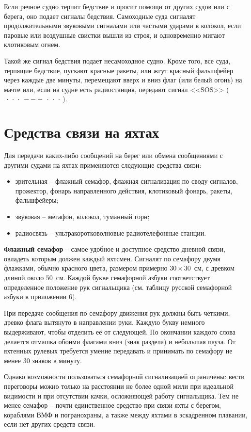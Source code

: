 \documentclass[a4paper, 12pt, twoside, final]{scrbook}
\begin{document}
Если речное судно терпит бедствие и просит помощи от других судов или с берега, оно подает сигналы бедствия. Самоходные суда сигналят продолжительными звуковыми сигналами или частыми ударами в колокол, если паровые или воздушные свистки вышли из строя, и одновременно мигают клотиковым огнем.

Такой же сигнал бедствия подает несамоходное судно. Кроме того, все суда, терпящие бедствие, пускают красные ракеты, или жгут красный фальшфейер через каждые две минуты, перемещают вверх и вниз флаг (или белый огонь) на мачте или, если на судне есть радиостанция, передают сигнал <<SOS>> ($\ \cdot\ \cdot\ \cdot\ - - -\ \cdot\ \cdot\ \cdot\ $).

\section{Средства связи на яхтах}

Для передачи каких-либо сообщений на берег или обмена сообщениями с другими судами на яхтах применяются следующие средства связи:

\begin{itemize}
\item зрительная \--- флажный семафор, флажная сигнализация по своду сигналов, прожектор, фонарь направленного действия, клотиковый фонарь, ракеты, фальшфейеры;
\item звуковая \--- мегафон, колокол, туманный горн;
\item радиосвязь \--- ультракоротковолновые радиотелефонные станции.
\end{itemize}

        \textbf{Флажный семафор} \--- самое удобное и доступное средство дневной связи, овладеть которым должен каждый яхтсмен. Сигналят по семафору двумя флажками, обычно красного цвета, размером примерно $30\times30$~см, с древком длиной около 50~см. Каждой букве семафорной азбуки соответствует определенное положение рук сигнальщика (см. таблицу русской семафорной азбуки в приложении 6).

        При передаче сообщения по семафору движения рук должны быть четкими, древко флага вытянуто в направлении руки. Каждую букву немного выдерживают, чтобы отделить её от следующей. По окончании каждого слова делается отмашка обоими флагами вниз (знак раздела) и небольшая пауза. От яхтенных рулевых требуется умение передавать и принимать по семафору не менее 30 знаков в минуту.

        Однако возможности пользоваться семафорной сигнализацией ограничены: вести переговоры можно только на расстоянии не более одной мили при идеальной видимости и при отсутствии качки, осложняющей работу сигнальщика. Тем не менее семафор \--- почти единственное средство при связи яхты с берегом, кораблями ВМФ и погранохраны, а также между яхтами в эскадренном плавании, если нет других средств связи.
\end{document}

